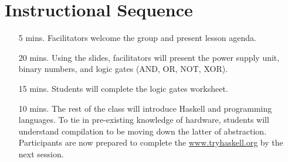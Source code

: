 \documentclass[11pt]{article}
\begin{document}
\section*{Instructional Sequence}

\begin{itemize}
  \item[5 mins.]
    Facilitators welcome the group and present lesson agenda.

  \item[20 mins.]
    Using the slides, facilitators will present the power supply unit, binary
    numbers, and logic gates (AND, OR, NOT, XOR).

  \item[15 mins.]
    Students will complete the logic gates worksheet.

  \item[10 mins.]
    The rest of the class will introduce Haskell and programming languages. To
    tie in pre-existing knowledge of hardware, students will understand
    compilation to be moving down the latter of abstraction. Participants are
    now prepared to complete the \url{www.tryhaskell.org} by the next session.
\end{itemize}
\end{document}
